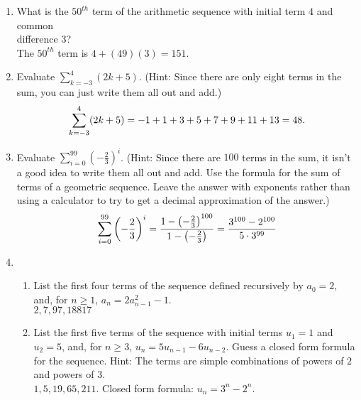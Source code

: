 \documentclass[11pt]{amsart}
\begin{document}
\begin{enumerate}

\item  What is the $50^{th}$ term of the arithmetic sequence with initial
term $4$ and common\\
 difference $3$?\\[3pt]
 {\color{blue}
 The $50^{th}$ term is $4 + (49)(3) = 151$.\\[5pt]
 }


\item Evaluate $\displaystyle\sum_{k=-3}^{4} (2k+5)$. (Hint: Since there are only eight terms in the sum, you can just write
them all out and add.)\\[3pt]
{\color{blue}
\[
\sum_{k=-3}^{4} (2k+5) = -1+1+3+5+7+9+11+13=48.\\[5pt]
\]
}

\item   Evaluate $\displaystyle \sum_{i=0}^{99} \left(-\frac{2}{3}\right)^i$. (Hint: Since there are $100$ terms in the sum, it isn't a good idea to write them all out and add. Use the formula for the sum of terms of a geometric sequence. Leave the answer with exponents rather than using a calculator to try to get a decimal approximation of the answer.) \\[3pt]
{\color{blue}
\[
\sum_{i=0}^{99} \left(-\frac{2}{3}\right)^i = \frac{ 1 - \left(-\frac{2}{3}\right)^{100}}{1-\left(-\frac{2}{3}\right)}
= \frac{3^{100}-2^{100}}{5\cdot 3^{99}}\\[5pt]
\]
}

\item 
\begin{enumerate}

\item List the first four terms of the sequence defined recursively by
 $a_0 = 2$, and, for $n\geq 1$, $a_n = 2a_{n-1}^2 -1$.\\[3pt]
 
 {\color{blue} $2, 7, 97, 18817$\\[5pt]}

\item List the first five terms of the sequence with initial terms
$u_1=1$ and $u_2=5$, and, for $n\geq 3$, $u_n = 5u_{n-1}-6u_{n-2}$.
Guess a closed form formula for the sequence.
Hint: The terms
are simple combinations of powers of $2$ and powers of $3$.\\[3pt]

{\color{blue} $1, 5, 19, 65, 211$. Closed form formula: $u_n = 3^n - 2^n$.\\[5pt]}



\end{enumerate}
\end{enumerate}
\end{document}
